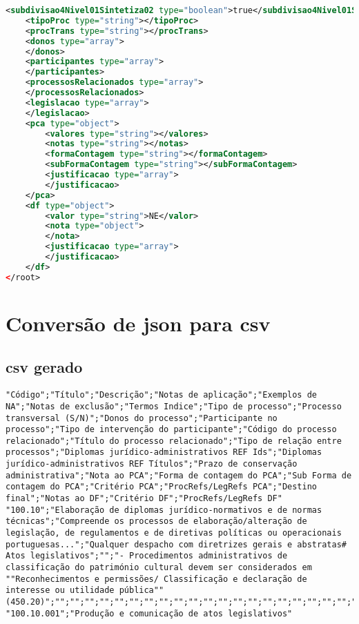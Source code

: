 \begin{lstlisting}[language=xml, caption=\acrshort{xml} resultante da conversão do \acrshort{json} presente em~\ref{exem:json}]
    <subdivisao4Nivel01Sintetiza02 type="boolean">true</subdivisao4Nivel01Sintetiza02>
    <tipoProc type="string"></tipoProc>
    <procTrans type="string"></procTrans>
    <donos type="array">
    </donos>
    <participantes type="array">
    </participantes>
    <processosRelacionados type="array">
    </processosRelacionados>
    <legislacao type="array">
    </legislacao>
    <pca type="object">
        <valores type="string"></valores>
        <notas type="string"></notas>
        <formaContagem type="string"></formaContagem>
        <subFormaContagem type="string"></subFormaContagem>
        <justificacao type="array">
        </justificacao>
    </pca>
    <df type="object">
        <valor type="string">NE</valor>
        <nota type="object">
        </nota>
        <justificacao type="array">
        </justificacao>
    </df>
</root>
\end{lstlisting}

\section{Conversão de \acrshort{json} para \acrshort{csv}}\label{conv:jsonTOcsv}

\subsection{\acrshort{csv} gerado}
\begin{lstlisting}[language=pseudocode, caption=\acrshort{csv} resultante da conversão do \acrshort{json} presente em~\ref{exem:json}]
"Código";"Título";"Descrição";"Notas de aplicação";"Exemplos de NA";"Notas de exclusão";"Termos Indice";"Tipo de processo";"Processo transversal (S/N)";"Donos do processo";"Participante no processo";"Tipo de intervenção do participante";"Código do processo relacionado";"Título do processo relacionado";"Tipo de relação entre processos";"Diplomas jurídico-administrativos REF Ids";"Diplomas jurídico-administrativos REF Títulos";"Prazo de conservação administrativa";"Nota ao PCA";"Forma de contagem do PCA";"Sub Forma de contagem do PCA";"Critério PCA";"ProcRefs/LegRefs PCA";"Destino final";"Notas ao DF";"Critério DF";"ProcRefs/LegRefs DF"
"100.10";"Elaboração de diplomas jurídico-normativos e de normas técnicas";"Compreende os processos de elaboração/alteração de legislação, de regulamentos e de diretivas políticas ou operacionais portuguesas...";"Qualquer despacho com diretrizes gerais e abstratas#
Atos legislativos";"";"- Procedimentos administrativos de classificação do património cultural devem ser considerados em ""Reconhecimentos e permissões/ Classificação e declaração de interesse ou utilidade pública"" (450.20)";"";"";"";"";"";"";"";"";"";"";"";"";"";"";"";"";"";"";"";"";""
"100.10.001";"Produção e comunicação de atos legislativos"
\end{lstlisting}

